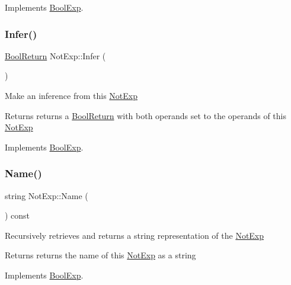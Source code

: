 Implements \mbox{\hyperlink{classBoolExp_a591fb5f9cb849e0f56e596406a9a10d0}{Bool\+Exp}}.

\mbox{\label{classNotExp_ad7ec5fee6dd934a3db7f72cc9e0b809a}} 
\subsubsection{\texorpdfstring{Infer()}{Infer()}}
{\footnotesize\ttfamily \mbox{\hyperlink{structBoolReturn}{Bool\+Return}} Not\+Exp\+::\+Infer (\begin{DoxyParamCaption}{ }\end{DoxyParamCaption})\hspace{0.3cm}{\ttfamily [virtual]}}

Make an inference from this \mbox{\hyperlink{classNotExp}{Not\+Exp}} \begin{DoxyReturn}{Returns}
returns a \mbox{\hyperlink{structBoolReturn}{Bool\+Return}} with both operands set to the operands of this \mbox{\hyperlink{classNotExp}{Not\+Exp}} 
\end{DoxyReturn}


Implements \mbox{\hyperlink{classBoolExp_a0e5d4a241332ae72d083645e4b71e0e6}{Bool\+Exp}}.

\mbox{\label{classNotExp_a7363cb79787e02ca362a4ea6cdd6d7e2}} 
\subsubsection{\texorpdfstring{Name()}{Name()}}
{\footnotesize\ttfamily string Not\+Exp\+::\+Name (\begin{DoxyParamCaption}{ }\end{DoxyParamCaption}) const\hspace{0.3cm}{\ttfamily [virtual]}}

Recursively retrieves and returns a string representation of the \mbox{\hyperlink{classNotExp}{Not\+Exp}} \begin{DoxyReturn}{Returns}
returns the name of this \mbox{\hyperlink{classNotExp}{Not\+Exp}} as a string 
\end{DoxyReturn}


Implements \mbox{\hyperlink{classBoolExp_a3fdb64a9b8fd54e33d755ff4a577d11a}{Bool\+Exp}}.

\mbox{\label{classNotExp_aeba42c37b59e0eaaf981260e4b163d98}} 
